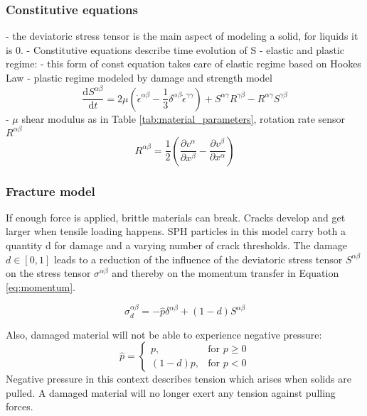 \subsubsection{Constitutive equations}
- the deviatoric stress tensor is the main aspect of modeling a solid, for liquids it is 0.
- Constitutive equations describe time evolution of S
- elastic and plastic regime:
- this form of const equation takes care of elastic regime based on Hookes Law
- plastic regime modeled by damage and strength model
\begin{equation}
    \frac{\mathrm {d}S^{\alpha \beta} }{\mathrm {d}t}  = 2\mu \left(\dot{\epsilon}^{\alpha \beta} - \frac{1}{3}\delta^{\alpha \beta}\dot{\epsilon}^{\gamma \gamma}\right) + S^{\alpha \gamma}R^{\gamma \beta} - R^{\alpha \gamma}S^{\gamma \beta}
\end{equation}
- $\mu$ shear modulus as in Table \ref{tab:material_parameters}, rotation rate sensor $R^{\alpha \beta}$
\begin{equation}
    R^{\alpha \beta} = \frac{1}{2} \left(\frac{\partial v^{\alpha} }{\partial x^\beta} - \frac{\partial v^{\beta} }{\partial x^\alpha}\right)
\end{equation}

\subsubsection{Fracture model} \label{sect:fracture_model}
If enough force is applied, brittle materials can break. Cracks develop and get larger when tensile loading happens. SPH particles in this model carry both a quantity d for damage and a varying number of crack thresholds. The damage $d \in \left[0, 1\right]$ leads to a reduction of the influence of the deviatoric stress tensor $S^{\alpha \beta}$ on the stress tensor $\sigma^{\alpha \beta}$ and thereby on the momentum transfer in Equation \ref{eq:momentum}.

\begin{equation}
    \sigma^{\alpha \beta}_d = -\hat{p}\delta^{\alpha \beta} + (1 - d)S^{\alpha \beta}
\end{equation}

Also, damaged material will not be able to experience negative pressure:
\begin{equation}
    \hat{p} =
    \begin{cases}
        p,        & \text{for } p \geq 0 \\
        (1 - d)p, & \text{for } p < 0
    \end{cases}
\end{equation}
Negative pressure in this context describes tension which arises when solids are pulled. A damaged material will no longer exert any tension against pulling forces. \\

